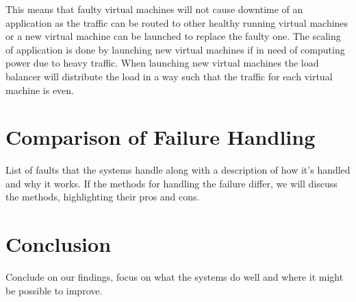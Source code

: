 \documentclass[11pt]{report}
\begin{document}
This means that faulty virtual machines will not cause downtime of an application as the traffic can be routed to other healthy running virtual machines or a new virtual machine can be launched to replace the faulty one. The scaling of application is done by launching new virtual machines if in need of computing power due to heavy traffic. When launching new virtual machines the load balancer will distribute the load in a way such that the traffic for each virtual machine is even.

\chapter{Comparison of Failure Handling}
List of faults that the systems handle along with a description of how it's handled and why it works. If the methods for handling the failure differ, we will discuss the methods, highlighting their pros and cons.

\chapter{Conclusion}
Conclude on our findings, focus on what the systems do well and where it might be possible to improve.
\end{document}
